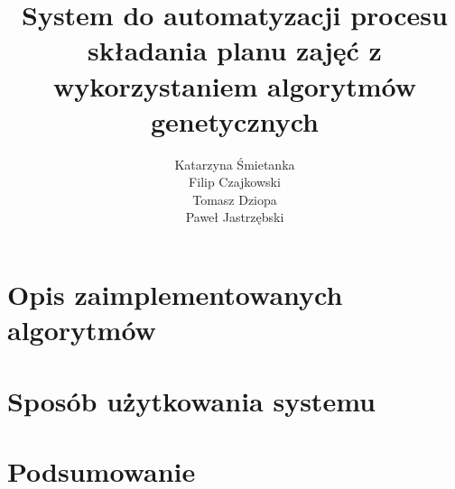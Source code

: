 \documentclass[11pt]{report}
\title{System do automatyzacji procesu składania planu zajęć z wykorzystaniem algorytmów genetycznych}
\author{
	Katarzyna Śmietanka \\
	Filip Czajkowski \\
	Tomasz Dziopa\\
	Paweł Jastrzębski
}
\begin{document}
%
%

\maketitle
\tableofcontents









\chapter{Opis zaimplementowanych algorytmów}








\chapter{Sposób użytkowania systemu}

\chapter{Podsumowanie}

\end{document}
